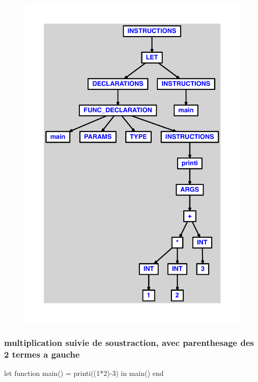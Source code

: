 \documentclass{article}
\begin{document}
\begin{figure}[H]\centering\includegraphics[max width=\textwidth]{ast/ast_99.pdf}\end{figure}\subsubsection{multiplication suivie de soustraction, avec parenthesage des 2 termes a gauche}
\begin{verbatimtab}
let function main() = printi((1*2)-3) in main() end
\end{verbatimtab}
\end{document}

